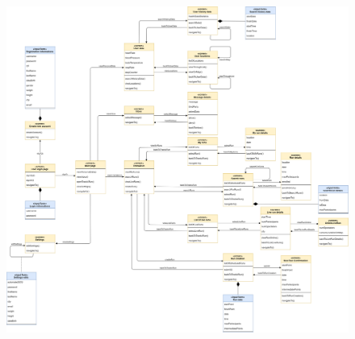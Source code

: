 \begin{figure}[H]
    \centering
    \includegraphics[width=1\textwidth]{DD/Pictures/UXMobile.png}
    
\end{figure}